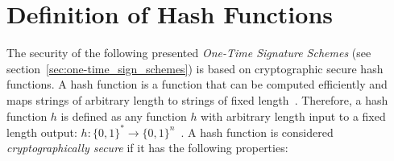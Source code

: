

\section{Definition of Hash Functions} 
The security of the following presented \textit{One-Time Signature Schemes} (see section~\ref{sec:one-time_sign_schemes}) %
is based on cryptographic secure hash functions. A hash function is a function that can be computed efficiently and maps strings of arbitrary length to strings of fixed length~\cite{cha:bg_hashfunctions_thesis_matusiewicz2007}. Therefore, a hash function $h$ is defined as any function $h$ with arbitrary length input to a fixed length output: $h: \{0,1\}^* \rightarrow \{0,1\}^n$~\cite{cha:bg_hashfunctoins_Stinson2006}. A hash function is considered \textit{cryptographically secure} if it has the following  properties:~\cite{cha:bg_hashfunctions_BASIC_DEFINITIONS_Springer2004} 

